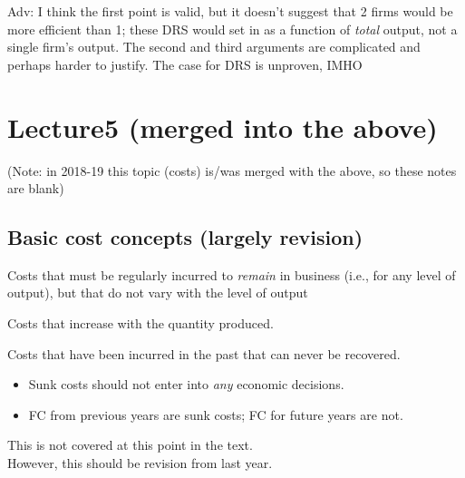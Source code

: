 \documentclass[]{article}
\providecommand{\tightlist}{%
  \setlength{\itemsep}{0pt}\setlength{\parskip}{0pt}}
\begin{document}
Adv: I think the first point is valid, but it doesn't suggest that 2 firms would be more efficient than 1; these DRS would set in as a function of \emph{total} output, not a single firm's output. The second and third arguments are complicated and perhaps harder to justify. The case for DRS is unproven, IMHO

\hypertarget{lecture5-merged-into-the-above}{%
\section{Lecture5 (merged into the above)}\label{lecture5-merged-into-the-above}}

(Note: in 2018-19 this topic (costs) is/was merged with the above, so these notes are blank)

\hypertarget{basic-cost-concepts-largely-revision}{%
\subsection{Basic cost concepts (largely revision)}\label{basic-cost-concepts-largely-revision}}

\begin{description}
\tightlist
\item[Fixed costs (FC)]
Costs that must be regularly incurred to \emph{remain} in business (i.e., for any level of output), but that do not vary with the level of output
\end{description}

\begin{description}
\tightlist
\item[Variable costs (VC)]
Costs that increase with the quantity produced.
\end{description}

\begin{description}
\tightlist
\item[Sunk costs]
Costs that have been incurred in the past that can never be recovered.
\end{description}

\begin{itemize}
\tightlist
\item
  Sunk costs should not enter into \emph{any} economic decisions.
\item
  FC from previous years are sunk costs; FC for future years are not.
\end{itemize}

This is not covered at this point in the text.\\
However, this should be revision from last year.
\end{document}
